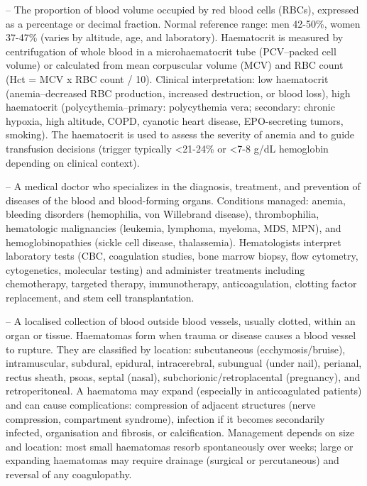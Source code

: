 -- The proportion of blood volume occupied by red blood cells (RBCs), expressed as a percentage or decimal fraction. Normal reference range: men 42-50\%, women 37-47\% (varies by altitude, age, and laboratory). Haematocrit is measured by centrifugation of whole blood in a microhaematocrit tube (PCV--packed cell volume) or calculated from mean corpuscular volume (MCV) and RBC count (Hct = MCV x RBC count / 10). Clinical interpretation: low haematocrit (anemia--decreased RBC production, increased destruction, or blood loss), high haematocrit (polycythemia--primary: polycythemia vera; secondary: chronic hypoxia, high altitude, COPD, cyanotic heart disease, EPO-secreting tumors, smoking). The haematocrit is used to assess the severity of anemia and to guide transfusion decisions (trigger typically <21-24\% or <7-8 g/dL hemoglobin depending on clinical context).

-- A medical doctor who specializes in the diagnosis, treatment, and prevention of diseases of the blood and blood-forming organs. Conditions managed: anemia, bleeding disorders (hemophilia, von Willebrand disease), thrombophilia, hematologic malignancies (leukemia, lymphoma, myeloma, MDS, MPN), and hemoglobinopathies (sickle cell disease, thalassemia). Hematologists interpret laboratory tests (CBC, coagulation studies, bone marrow biopsy, flow cytometry, cytogenetics, molecular testing) and administer treatments including chemotherapy, targeted therapy, immunotherapy, anticoagulation, clotting factor replacement, and stem cell transplantation.

-- A localised collection of blood outside blood vessels, usually clotted, within an organ or tissue. Haematomas form when trauma or disease causes a blood vessel to rupture. They are classified by location: subcutaneous (ecchymosis/bruise), intramuscular, subdural, epidural, intracerebral, subungual (under nail), perianal, rectus sheath, psoas, septal (nasal), subchorionic/retroplacental (pregnancy), and retroperitoneal. A haematoma may expand (especially in anticoagulated patients) and can cause complications: compression of adjacent structures (nerve compression, compartment syndrome), infection if it becomes secondarily infected, organisation and fibrosis, or calcification. Management depends on size and location: most small haematomas resorb spontaneously over weeks; large or expanding haematomas may require drainage (surgical or percutaneous) and reversal of any coagulopathy.

